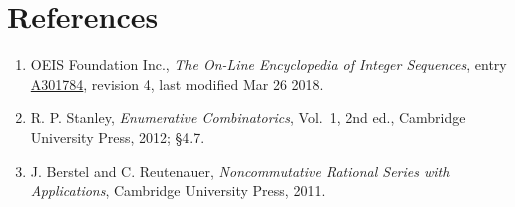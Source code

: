 \documentclass[11pt]{article}
\theoremstyle{definition}
\begin{document}
\section{References}

\begin{enumerate}

\item OEIS Foundation Inc., \emph{The On-Line Encyclopedia of Integer Sequences}, entry \href{https://oeis.org/A301784}{A301784}, revision 4, last modified Mar 26 2018.

\item R. P. Stanley, \emph{Enumerative Combinatorics}, Vol.~1, 2nd ed., Cambridge University Press, 2012; \S4.7.

\item J. Berstel and C. Reutenauer, \emph{Noncommutative Rational Series with Applications}, Cambridge University Press, 2011.

\end{enumerate}
\end{document}

